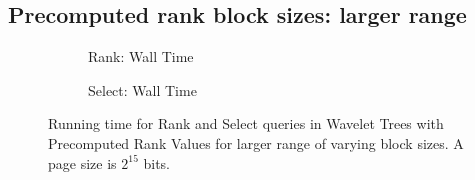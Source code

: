 \begin{appendices}


\section{Precomputed rank block sizes: larger range}
\begin{figure}[h!]\tiny
\begin{subfigure}{0.48\textwidth}
	
	\caption{Rank: Wall Time}
	\label{fig:PrecomputedRankBlockSize_Rank_WallTime}
\end{subfigure}
\hfill
\begin{subfigure}{0.48\textwidth}
	
	\caption{Select: Wall Time}
	\label{fig:PrecomputedRankBlockSize_Select_WallTime}
\end{subfigure}
\caption{Running time for Rank and Select queries in Wavelet Trees with Precomputed Rank Values for larger range of varying block sizes. A page size is $2^{15}$ bits.}
\end{figure}

\end{appendices}
\restoregeometry